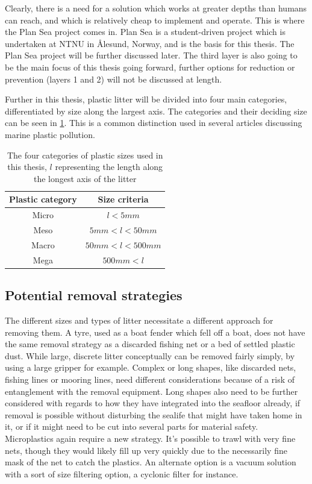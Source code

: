 \documentclass[class=article, crop=false]{standalone}
\begin{document}
Clearly, there is a need for a solution which works at greater depths than humans can reach, and which is relatively cheap to implement and operate. This is where the Plan Sea project comes in. Plan Sea is a student-driven project which is undertaken at NTNU in Ålesund, Norway, and is the basis for this thesis. The Plan Sea project will be further discussed later. The third layer is also going to be the main focus of this thesis going forward, further options for reduction or prevention (layers 1 and 2) will not be discussed at length.

Further in this thesis, plastic litter will be divided into four main categories, differentiated by size along the largest axis. The categories and their deciding size can be seen in \cref{tab:plastics}. This is a common distinction used in several articles discussing marine plastic pollution.

\begin{table}
\centering
\begin{tabular}{c|c}
\textbf{Plastic category} & \textbf{Size criteria} \\
\hline
Micro & \(l<5mm\) \\
Meso & \(5mm<l<50mm\) \\
Macro & \(50mm<l<500mm\)\\
Mega & \(500mm<l\)\\
\end{tabular}
\caption{The four categories of plastic sizes used in this thesis, \(l\) representing the length along the longest axis of the litter}
\label{tab:plastics}
\end{table}

\subsection{Potential removal strategies}
The different sizes and types of litter necessitate a different approach for removing them. A tyre, used as a boat fender which fell off a boat, does not have the same removal strategy as a discarded fishing net or a bed of settled plastic dust. While large, discrete litter conceptually can be removed fairly simply, by using a large gripper for example. Complex or long shapes, like discarded nets, fishing lines or mooring lines, need different considerations because of a risk of entanglement with the removal equipment. Long shapes also need to be further considered with regards to how they have integrated into the seafloor already, if removal is possible without disturbing the sealife that might have taken home in it, or if it might need to be cut into several parts for material safety. Microplastics again require a new strategy. It's possible to trawl with very fine nets, though they would likely fill up very quickly due to the necessarily fine mask of the net to catch the plastics. An alternate option is a vacuum solution with a sort of size filtering option, a cyclonic filter for instance.
\end{document}
